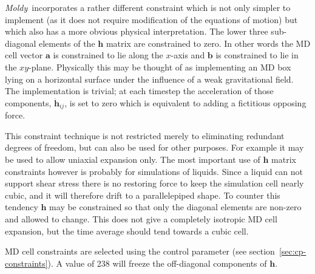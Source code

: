 \documentclass[a4paper,twoside]{report}
\newcommand{\bm}[1]{\mathbf{#1}}
\newcommand{\moldy}{\emph{Moldy}}
\begin{document}
\moldy\ incorporates a rather different constraint which is not only
simpler to implement (as it does not require modification of the
equations of motion) but which also has a more obvious physical
interpretation.  The lower three sub-diagonal elements of the $\bm{h}$
matrix are constrained to zero.  In other words the MD cell vector
$\bm{a}$ is constrained to lie along the $x$-axis and $\bm{b}$ is
constrained to lie in the $xy$-plane.  Physically this may be thought
of as implementing an MD box lying on a horizontal surface under the
influence of a weak gravitational field.  The implementation is
trivial; at each timestep the acceleration of those components,
$\ddot{\bm{h}}_{ij}$, is set to zero which is equivalent to adding a
fictitious opposing force.

This constraint technique is not restricted merely to eliminating
redundant degrees of freedom, but can also be used for other purposes.
For example it may be used to allow uniaxial expansion only.  The most
important use of $\bm{h}$ matrix constraints however is probably for
simulations of liquids.  Since a liquid can not support shear stress
there is no restoring force to keep the simulation cell nearly cubic,
and it will therefore drift to a parallelepiped shape.  To counter
this tendency $\bm{h}$ may be constrained so that only the diagonal
elements are non-zero and allowed to change.  This does not give a
completely isotropic MD cell expansion, but the time average should
tend towards a cubic cell.

MD cell constraints are selected using the control parameter
 (see section~\ref{sec:cp-constraints}).  A value of
238 will freeze the off-diagonal components of $\bm{h}$.

\end{document}
